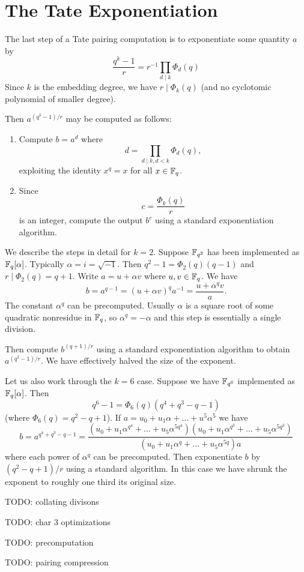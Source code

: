 \section {The Tate Exponentiation}

The last step of a Tate pairing computation is
to exponentiate some quantity $a$ by
\[ \frac{q^k-1}{r} = r^{-1} \prod_{d\mid k} \Phi_d(q) \]
Since $k$ is the embedding degree, we have $r \mid \Phi_k(q)$ (and no
cyclotomic polynomial of smaller degree).

Then $a^{(q^k-1)/r}$ may be computed as follows:
\begin{enumerate}
\item
Compute $b = a^d $ where
\[ d = \prod_{d\mid k, d<k} \Phi_d(q) , \]
exploiting the identity $x^q = x$ for all $x \in \mathbb{F}_q$.
\item
Since
\[ c = \frac{\Phi_k(q)}{r} \]
is an integer, compute the output $b^c$
using a standard exponentiation algorithm.
\end{enumerate}

We describe the steps in detail
for $k = 2$. Suppose $\mathbb{F}_{q^2}$ has been implemented
as $\mathbb{F}_q[\alpha]$. Typically $\alpha = i = \sqrt{-1}$.
Then $q^2 - 1 = \Phi_2(q)(q-1)$ and
$r \mid \Phi_2(q) = q + 1$. Write $a = u + \alpha v$ where $u,v \in \mathbb{F}_q$.
We have
\[ b = a^{q-1} = (u + \alpha v)^q a^{-1} = \frac{u + \alpha^q v}{a} .\]
The constant $\alpha^q$ can be precomputed. Usually $\alpha$ is a square root
of some quadratic nonresidue in $\mathbb{F}_q$, so $\alpha^q = -\alpha$ and
this step is essentially a single division.

Then compute $b^{(q+1)/r}$ using a standard exponentiation algorithm
to obtain $a^{(q^2-1)/r}$. We have effectively halved the size of the exponent.

Let us also work through the $k = 6$ case. Suppose we have $\mathbb{F}_{q^6}$
implemented as $\mathbb{F}_q[\alpha]$. Then
\[ q^6 - 1 = \Phi_6(q) (q^4 + q^3 - q - 1)\]
(where $\Phi_6(q) = q^2 - q + 1$).
If $a = u_0 + u_1 \alpha + ... + u^5 \alpha^5$ we have
\[ b =
a^{q^4 + q^3 - q - 1}
= \frac{
(u_0 + u_1 \alpha^{q^4} + ... + u_5 \alpha^{5q^4})
(u_0 + u_1 \alpha^{q^3} + ... + u_5 \alpha^{5q^3})}
{
(u_0 + u_1 \alpha^q + ... + u_5 \alpha^{5q})a
}
\]
where each power of $\alpha^q$ can be precomputed. Then exponentiate $b$
by $(q^2 - q + 1)/r$ using a standard algorithm.
In this case we have shrunk the exponent to roughly one third its original
size.

TODO: collating divisons

TODO: char 3 optimizations

TODO: precomputation

TODO: pairing compression
